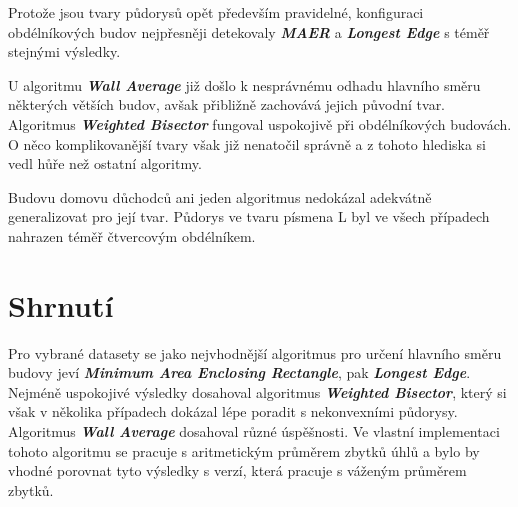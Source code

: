 \par Protože jsou tvary půdorysů opět především pravidelné, konfiguraci obdélníkových budov nejpřesněji detekovaly \textbf{\emph{MAER}} a \textbf{\emph{Longest Edge}} s téměř stejnými výsledky. 
\par U algoritmu \textbf{\emph{Wall Average}} již došlo k nesprávnému odhadu hlavního směru některých větších budov, avšak přibližně zachovává jejich původní tvar. Algoritmus \textbf{\emph{Weighted Bisector}} fungoval uspokojivě při obdélníkových budovách. O něco komplikovanější tvary však již nenatočil správně a z tohoto hlediska si vedl hůře než ostatní algoritmy.
\par Budovu domovu důchodců ani jeden algoritmus nedokázal adekvátně generalizovat pro její tvar. Půdorys ve tvaru písmena L byl ve všech případech nahrazen téměř čtvercovým obdélníkem.

\section*{Shrnutí}

\par Pro vybrané datasety se jako nejvhodnější algoritmus pro určení hlavního směru budovy jeví \textbf{\emph{Minimum Area Enclosing Rectangle}}, pak \textbf{\emph{Longest Edge}}. Nejméně uspokojivé výsledky dosahoval algoritmus \textbf{\emph{Weighted Bisector}}, který si však v několika případech dokázal lépe poradit s nekonvexními půdorysy. Algoritmus \textbf{\emph{Wall Average}} dosahoval různé úspěšnosti. Ve vlastní implementaci tohoto algoritmu se pracuje s aritmetickým průměrem zbytků úhlů a bylo by vhodné porovnat tyto výsledky s verzí, která pracuje s váženým průměrem zbytků.